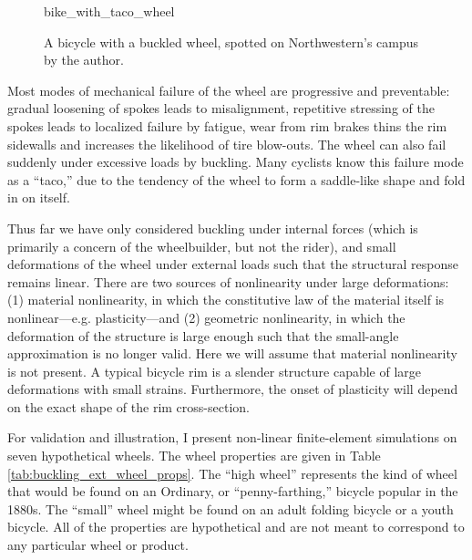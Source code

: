 \documentclass[\rootdir/thesis.tex]{subfiles}
\begin{document}
\begin{figure}[b]
\centering
{bike_with_taco_wheel}
\caption{A bicycle with a buckled wheel, spotted on Northwestern's campus by the author.}
\label{fig:bike_taco_wheel}
\end{figure}

Most modes of mechanical failure of the wheel are progressive and preventable: gradual loosening of spokes leads to misalignment, repetitive stressing of the spokes leads to localized failure by fatigue, wear from rim brakes thins the rim sidewalls and increases the likelihood of tire blow-outs. The wheel can also fail suddenly under excessive loads by buckling. Many cyclists know this failure mode as a ``taco,'' due to the tendency of the wheel to form a saddle-like shape and fold in on itself.

Thus far we have only considered buckling under internal forces (which is primarily a concern of the wheelbuilder, but not the rider), and small deformations of the wheel under external loads such that the structural response remains linear. There are two sources of nonlinearity under large deformations: (1) material nonlinearity, in which the constitutive law of the material itself is nonlinear---e.g. plasticity---and (2) geometric nonlinearity, in which the deformation of the structure is large enough such that the small-angle approximation is no longer valid. Here we will assume that material nonlinearity is not present. A typical bicycle rim is a slender structure capable of large deformations with small strains. Furthermore, the onset of plasticity will depend on the exact shape of the rim cross-section.

For validation and illustration, I present non-linear finite-element simulations on seven hypothetical wheels. The wheel properties are given in Table \ref{tab:buckling_ext_wheel_props}. The ``high wheel'' represents the kind of wheel that would be found on an Ordinary, or ``penny-farthing,'' bicycle popular in the 1880s. The ``small'' wheel might be found on an adult folding bicycle or a youth bicycle. All of the properties are hypothetical and are not meant to correspond to any particular wheel or product.
\end{document}
